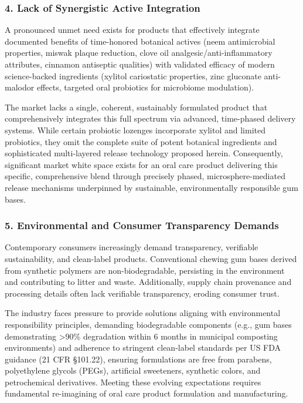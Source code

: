 \documentclass[12pt]{article}
\begin{document}
\subsubsection*{4. Lack of Synergistic Active Integration}
A pronounced unmet need exists for products that effectively integrate documented benefits of time-honored botanical actives (neem antimicrobial properties, miswak plaque reduction, clove oil analgesic/anti-inflammatory attributes, cinnamon antiseptic qualities) with validated efficacy of modern science-backed ingredients (xylitol cariostatic properties, zinc gluconate anti-malodor effects, targeted oral probiotics for microbiome modulation).

The market lacks a single, coherent, sustainably formulated product that comprehensively integrates this full spectrum via advanced, time-phased delivery systems. While certain probiotic lozenges incorporate xylitol and limited probiotics, they omit the complete suite of potent botanical ingredients and sophisticated multi-layered release technology proposed herein. Consequently, significant market white space exists for an oral care product delivering this specific, comprehensive blend through precisely phased, microsphere-mediated release mechanisms underpinned by sustainable, environmentally responsible gum bases.

\subsubsection*{5. Environmental and Consumer Transparency Demands}
Contemporary consumers increasingly demand transparency, verifiable sustainability, and clean-label products. Conventional chewing gum bases derived from synthetic polymers are non-biodegradable, persisting in the environment and contributing to litter and waste. Additionally, supply chain provenance and processing details often lack verifiable transparency, eroding consumer trust.

The industry faces pressure to provide solutions aligning with environmental responsibility principles, demanding biodegradable components (e.g., gum bases demonstrating >90\% degradation within 6 months in municipal composting environments) and adherence to stringent clean-label standards per US FDA guidance (21 CFR §101.22), ensuring formulations are free from parabens, polyethylene glycols (PEGs), artificial sweeteners, synthetic colors, and petrochemical derivatives. Meeting these evolving expectations requires fundamental re-imagining of oral care product formulation and manufacturing.
\end{document}
